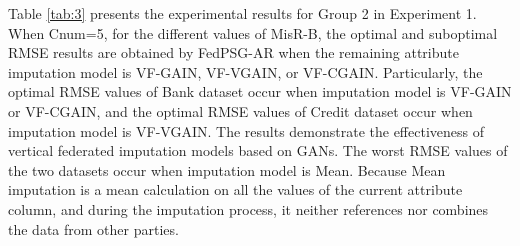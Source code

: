 \documentclass[final,1p,times]{elsarticle}
\begin{document}
Table \ref{tab:3} presents the experimental results for Group 2 in Experiment 1. When Cnum=5, for the different values of MisR-B, the optimal and suboptimal RMSE results are obtained by FedPSG-AR when the remaining attribute imputation model is VF-GAIN, VF-VGAIN, or VF-CGAIN. Particularly, the optimal RMSE values of Bank dataset occur when imputation model is VF-GAIN or VF-CGAIN, and the optimal RMSE values of Credit dataset occur when imputation model is VF-VGAIN. The results demonstrate the effectiveness of vertical federated imputation models based on GANs. The worst RMSE values of the two datasets occur when imputation model is Mean. Because Mean imputation is a mean calculation on all the values of the current attribute column, and during the imputation process, it neither references nor combines the data from other parties.
\begin{table*}[h]
	\centering
	\caption{RMSE obtained by FedPSG-AR with different imputation models for Bank and Credit Dataset (The optimal and suboptimal results are highlighted in \textcolor{red}{red} and \textcolor{blue}{blue}, respectively. MisR-B=0.2, 0.5, 0.8)}
	\label{tab:3}
\end{table*}
\end{document}
